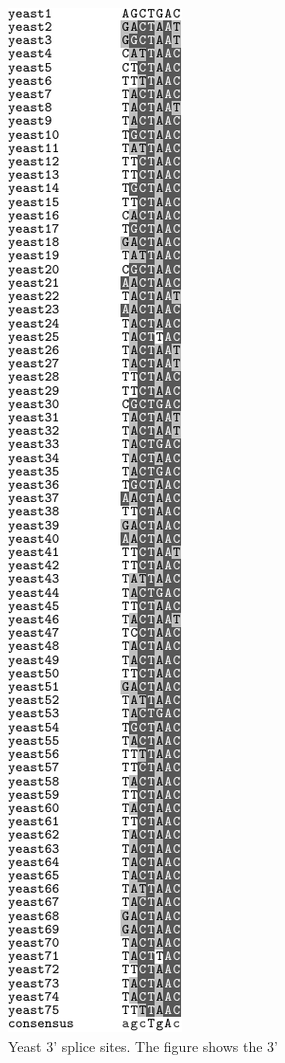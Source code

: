             \begin{figure}
            \centering
            \includegraphics[angle=90]{Body/Images-chap1/yeast.pdf}
            \caption[Yeast 3' splice sites]{Yeast 3' splice sites.  The figure shows the 3'
}
\end{figure}

